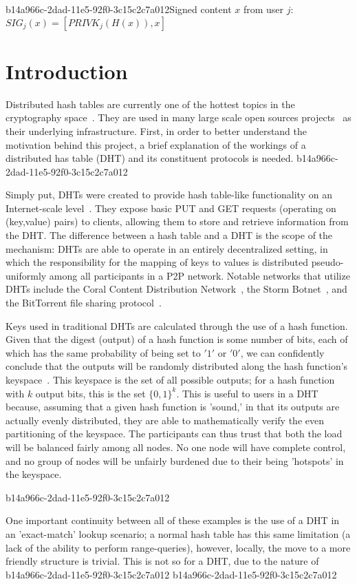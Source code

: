 \documentclass[12pt]{article}
\begin{document}
b14a966c-2dad-11e5-92f0-3c15c2c7a012Signed content $x$ from user $j$: $SIG_j(x) = \left[ PRIVK_j( H(x) ), x \right]$

\section{Introduction}
\par Distributed hash tables are currently one of the hottest topics in the cryptography space~\cite{Stoica:2001dj,Rowstron:2001ea,Ratnasamy:2001wn}. They are used in many large scale open sources projects~\cite{Freitas:2013tb,Xu:2010vs,Perfitt:2010fh} as their underlying infrastructure. First, in order to better understand the motivation behind this project, a brief explanation of the workings of a distributed has table (DHT) and its constituent protocols is needed.
b14a966c-2dad-11e5-92f0-3c15c2c7a012
\par Simply put, DHTs were created to provide hash table-like functionality on an Internet-scale level~\cite{Ratnasamy:2001wn}. They expose basic PUT and GET requests (operating on (key,value) pairs) to clients, allowing them to store and retrieve information from the DHT. The difference between a hash table and a DHT is the scope of the mechanism: DHTs are able to operate in an entirely decentralized setting, in which the responsibility for the mapping of keys to values is distributed pseudo-uniformly among all participants in a P2P network. Notable networks that utilize DHTs include the Coral Content Distribution Network~\cite{Freedman:2004vb}, the Storm Botnet~\cite{Holz:2008uk}, and the BitTorrent file sharing protocol~\cite{Cohen:y1_8mBnw}.

\par Keys used in traditional DHTs are calculated through the use of a hash function. Given that the digest (output) of a hash function is some number of bits, each of which has the same probability of being set to $'1'$ or $'0'$, we can confidently conclude that the outputs will be randomly distributed along the hash function's keyspace~. This keyspace is the set of all possible outputs; for a hash function with $k$ output bits, this is the set $\{0,1\}^k$. This is useful to users in a DHT because, assuming that a given hash function is 'sound,' in that its outputs are actually evenly distributed, they are able to mathematically verify the even partitioning of the keyspace. The participants can thus trust that both the load will be balanced fairly among all nodes. No one node will have complete control, and no group of nodes will be unfairly burdened due to their being 'hotspots' in the keyspace.~

b14a966c-2dad-11e5-92f0-3c15c2c7a012\par One important continuity between all of these examples is the use of a DHT in an 'exact-match' lookup scenario; a normal hash table has this same limitation (a lack of the ability to perform range-queries), however, locally, the move to a more friendly structure is trivial. This is not so for a DHT, due to the nature of
b14a966c-2dad-11e5-92f0-3c15c2c7a012\printbibliography
b14a966c-2dad-11e5-92f0-3c15c2c7a012
\end{document}
